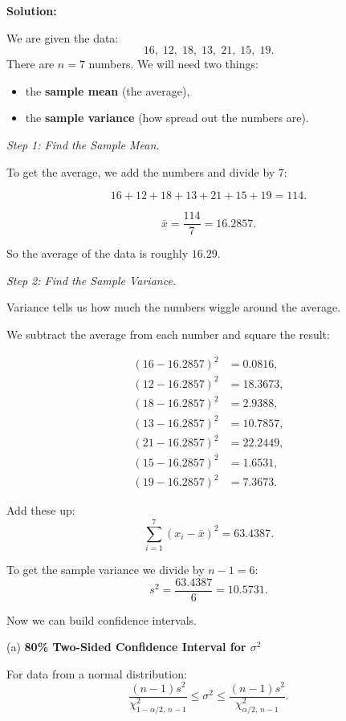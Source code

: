 \documentclass[11pt,letterpaper]{article}
\theoremstyle{remark}
\begin{document}
\vspace{1cm}

\textbf{Solution:}

We are given the data:
\[
16,\; 12,\; 18,\; 13,\; 21,\; 15,\; 19.
\]
There are $n=7$ numbers. We will need two things:
\begin{itemize}
    \item the \textbf{sample mean} (the average),
    \item the \textbf{sample variance} (how spread out the numbers are).
\end{itemize}

\medskip
\textit{Step 1: Find the Sample Mean.}

To get the average, we add the numbers and divide by 7:

\[
16 + 12 + 18 + 13 + 21 + 15 + 19 = 114.
\]

\[
\bar{x} = \frac{114}{7} = 16.2857.
\]

So the average of the data is roughly $16.29$.

\medskip
\textit{Step 2: Find the Sample Variance.}

Variance tells us how much the numbers wiggle around the average.

We subtract the average from each number and square the result:

\[
\begin{aligned}
(16-16.2857)^2 &= 0.0816, \\
(12-16.2857)^2 &= 18.3673, \\
(18-16.2857)^2 &= 2.9388, \\
(13-16.2857)^2 &= 10.7857, \\
(21-16.2857)^2 &= 22.2449, \\
(15-16.2857)^2 &= 1.6531, \\
(19-16.2857)^2 &= 7.3673.
\end{aligned}
\]

Add these up:
\[
\sum_{i=1}^7 (x_i - \bar{x})^2 = 63.4387.
\]

To get the sample variance we divide by $n-1 = 6$:
\[
s^2 = \frac{63.4387}{6} = 10.5731.
\]

\bigskip

Now we can build confidence intervals.

\medskip
(a) \textbf{80\% Two-Sided Confidence Interval for $\sigma^2$}

For data from a normal distribution:
\[
\frac{(n-1)s^2}{\chi^2_{1-\alpha/2,\, n-1}}
\le \sigma^2 \le
\frac{(n-1)s^2}{\chi^2_{\alpha/2,\, n-1}}.
\]
\end{document}
